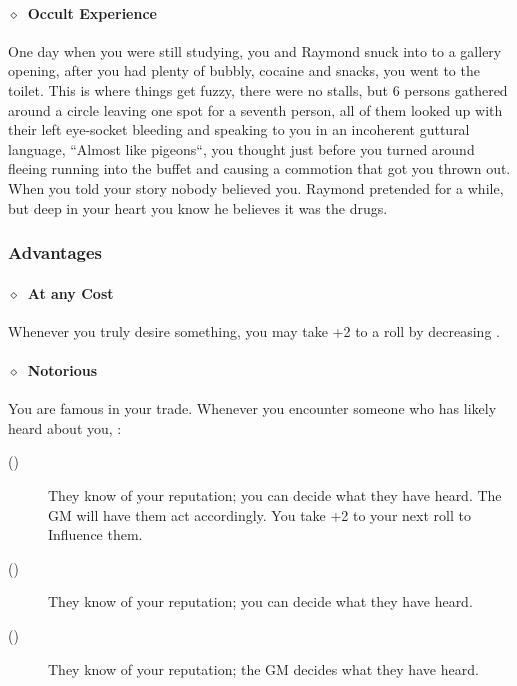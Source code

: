 \paragraph{\(\diamond\)~Occult Experience}%
One day when you were still studying, you and Raymond snuck into to a gallery opening, after you had plenty of bubbly, cocaine and snacks, you went to the toilet. This is where things get fuzzy, there were no stalls, but 6 persons gathered around a
circle leaving one spot for a seventh person, all of them looked up with their left eye-socket bleeding and speaking to you in
an incoherent guttural language, “Almost like pigeons“, you thought just before you turned around fleeing running into the
buffet and causing a commotion that got you thrown out. When you told your story nobody believed you. Raymond pretended for a while, but deep in your heart you know he believes it was the drugs.
\KULTrule%

\subsubsection{Advantages}%
\label{ssub:careerist_advantages}

\paragraph{\(\diamond\)~At any Cost}%
Whenever you truly desire something, you may take +2 to a roll by decreasing .
\KULTrule%

\paragraph{\(\diamond\)~Notorious}%
You are famous in your trade. Whenever you encounter someone who has likely heard about you,
:
\begin{description}
 \item[()] They know of your reputation; you can decide what they have heard. The GM
    will have them act accordingly. You take +2 to your next roll to Influence them.
 \item[()] They know of your reputation; you can decide what they have heard.
 \item[()] They know of your reputation; the GM decides what they have heard.
\end{description}
\KULTrule%

